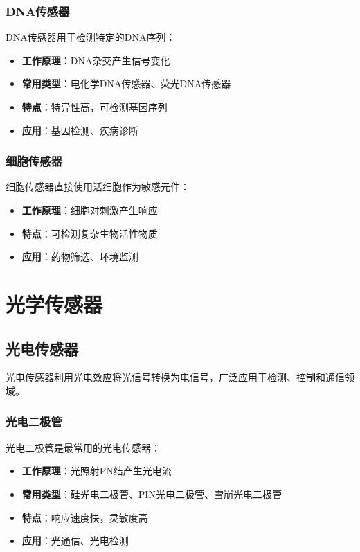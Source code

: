 \documentclass[12pt,UTF8]{ctexbook}
\begin{document}
\subsection{DNA传感器}

DNA传感器用于检测特定的DNA序列：

\begin{itemize}[leftmargin=2cm]
	\item \textbf{工作原理}：DNA杂交产生信号变化
	\item \textbf{常用类型}：电化学DNA传感器、荧光DNA传感器
	\item \textbf{特点}：特异性高，可检测基因序列
	\item \textbf{应用}：基因检测、疾病诊断
\end{itemize}

\subsection{细胞传感器}

细胞传感器直接使用活细胞作为敏感元件：

\begin{itemize}[leftmargin=2cm]
	\item \textbf{工作原理}：细胞对刺激产生响应
	\item \textbf{特点}：可检测复杂生物活性物质
	\item \textbf{应用}：药物筛选、环境监测
\end{itemize}

\chapter{光学传感器}

\section{光电传感器}

光电传感器利用光电效应将光信号转换为电信号，广泛应用于检测、控制和通信领域。

\subsection{光电二极管}

光电二极管是最常用的光电传感器：

\begin{itemize}[leftmargin=2cm]
	\item \textbf{工作原理}：光照射PN结产生光电流
	\item \textbf{常用类型}：硅光电二极管、PIN光电二极管、雪崩光电二极管
	\item \textbf{特点}：响应速度快，灵敏度高
	\item \textbf{应用}：光通信、光电检测
\end{itemize}
\end{document}
